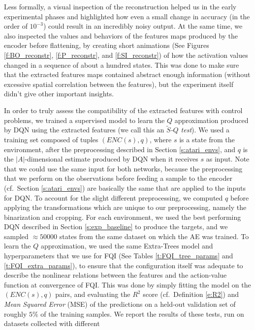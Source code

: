 %
Less formally, a visual inspection of the reconstruction helped us in the early 
experimental phases and highlighted how even a small change in accuracy (in the
order of $10^{-3}$) could result in an incredibly noisy output.
At the same time, we also inspected the values and behaviors of the features 
maps produced by the encoder before flattening, by creating short animations 
(See Figures \ref{f:BO_reconstr}, \ref{f:P_reconstr}, and \ref{f:SI_reconstr}) 
of how the activation values changed in a sequence of about a hundred states. 
This was done to make sure that the extracted features maps contained abstract
enough information (without excessive spatial correlation between the features),
but the experiment itself didn't give other important insights.

In order to truly assess the compatibility of the extracted features 
with control problems, we trained a supervised model to learn the $Q$ 
approximation produced by DQN using the extracted features (we call this 
an \textit{$\tilde{S}$-$Q$ test}). 
We used a training set composed of tuples $(ENC(s), q)$, where $s$ is a 
state from the environment, after the preprocessing described in Section 
\ref{s:atari_envs}, and $q$ is the $|A|$-dimensional estimate produced by DQN 
when it receives $s$ as input. Note that we could use the same input
for both networks, because the preprocessing that we perform on the observations 
before feeding a sample to the encoder (cf.\ Section \ref{s:atari_envs}) 
are basically the same that are applied to the inputs for DQN. To account for 
the slight different preprocessing, we computed $q$ before applying the 
transformations which are unique to our preprocessing, namely the binarization 
and cropping. 
For each environment, we used the best performing DQN described in Section 
\ref{s:exp_baseline} to produce the targets, and we sampled $\approx50000$ states
from the same dataset on which the AE was trained.
To learn the $Q$ approximation, we used the same Extra-Trees model and 
hyperparameters that we use for FQI (See Tables \ref{t:FQI_tree_params} and
\ref{t:FQI_extra_params}), to ensure that the configuration itself was 
adequate to describe the nonlinear relations between the features and the 
action-value function at convergence of FQI. 
This was done by simply fitting the model on the $(ENC(s), q)$ pairs, and 
evaluating the $R^2$ score (cf.\ Definition \eqref{e:R2}) and \textit{Mean 
Squared Error} (MSE) of the predictions on a held-out validation set of roughly 
$5\%$ of the training samples.
We report the results of these tests, run on datasets collected with different
